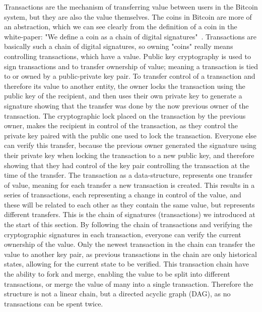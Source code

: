 Transactions are the mechanism of transferring value between users in the Bitcoin system, but they are also the value themselves.
The coins in Bitcoin are more of an abstraction, which we can see clearly from the definition of a coin in the white-paper: "We define a coin as a chain of digital signatures"~\cite{nakamoto2008bitcoin}.
Transactions are basically such a chain of digital signatures, so owning "coins" really means controlling transactions, which have a value.
Public key cryptography is used to sign transactions and to transfer ownership of value; meaning a transaction is tied to or owned by a public-private key pair.
To transfer control of a transaction and therefore its value to another entity, the owner locks the transaction using the public key of the recipient, and then uses their own private key to generate a signature showing that the transfer was done by the now previous owner of the transaction. The cryptographic lock placed on the transaction by the previous owner, makes the recipient in control of the transaction, as they control the private key paired with the public one used to lock the transaction. Everyone else  can verify this transfer, because the previous owner generated the signature using their private key when locking the transaction to a new public key, and therefore showing that they had control of the key pair controlling the transaction at the time of the transfer. The transaction as a data-structure, represents one transfer of value, meaning for each transfer a new transaction is created. This results in a series of transactions, each representing a change in control of the value, and these will be related to each other as they contain the same value, but represents different transfers. This is the chain of signatures (transactions) we introduced at the start of this section. By following the chain of transactions and verifying the cryptographic signatures in each transaction, everyone can verify the current ownership of the value. Only the newest transaction in the chain can transfer the value to another key pair, as previous transactions in the chain are only historical states, allowing for the current state to be verified. This transaction chain have the ability to fork and merge, enabling the value to be split into different transactions, or merge the value of many into a single transaction. Therefore the structure is not a linear chain, but a directed acyclic graph (DAG), as no transactions can be spent twice.

